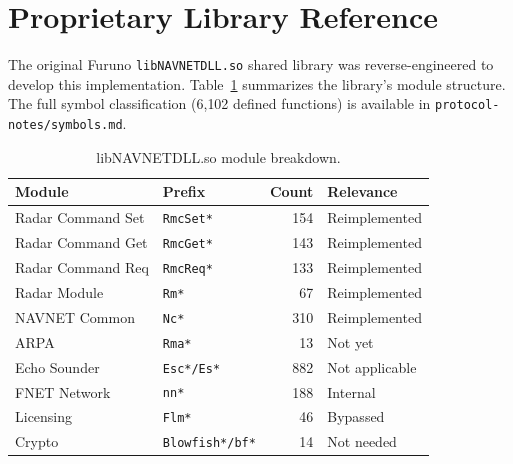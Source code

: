 \documentclass[11pt,letterpaper]{article}
\begin{document}
\section{Proprietary Library Reference}

The original Furuno \texttt{libNAVNETDLL.so} shared library was reverse-engineered to develop this implementation. Table~\ref{tab:symbols} summarizes the library's module structure. The full symbol classification (6{,}102 defined functions) is available in \texttt{protocol-notes/symbols.md}.

\begin{table}[h]
\centering
\caption{libNAVNETDLL.so module breakdown.}
\label{tab:symbols}
\begin{tabular}{@{}llrl@{}}
\toprule
\textbf{Module} & \textbf{Prefix} & \textbf{Count} & \textbf{Relevance} \\
\midrule
Radar Command Set & \texttt{RmcSet*} & 154 & Reimplemented \\
Radar Command Get & \texttt{RmcGet*} & 143 & Reimplemented \\
Radar Command Req & \texttt{RmcReq*} & 133 & Reimplemented \\
Radar Module & \texttt{Rm*} & 67 & Reimplemented \\
NAVNET Common & \texttt{Nc*} & 310 & Reimplemented \\
ARPA & \texttt{Rma*} & 13 & Not yet \\
Echo Sounder & \texttt{Esc*/Es*} & 882 & Not applicable \\
FNET Network & \texttt{nn*} & 188 & Internal \\
Licensing & \texttt{Flm*} & 46 & Bypassed \\
Crypto & \texttt{Blowfish*/bf*} & 14 & Not needed \\
\bottomrule
\end{tabular}
\end{table}
\end{document}
